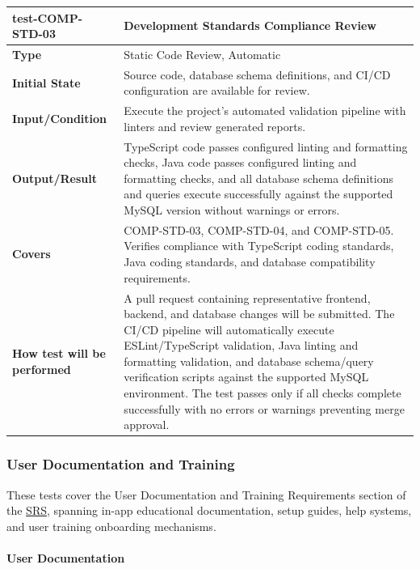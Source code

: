\documentclass[12pt, titlepage]{article}
\begin{document}
\noindent\begin{tabularx}{\textwidth}{>{\raggedright\arraybackslash}p{3.5cm}X}
  \toprule
  \textbf{test-COMP-STD-03} & \textbf{Development Standards Compliance Review}\\
  \midrule
  \textbf{Type} & Static Code Review, Automatic\\
  \textbf{Initial State} & Source code, database schema definitions, and CI/CD configuration are available for review.\\
  \textbf{Input/Condition} & Execute the project's automated validation pipeline with linters and review generated reports.\\
  \textbf{Output/Result} & TypeScript code passes configured linting and formatting checks, Java code passes configured linting and formatting checks, and all database schema definitions and queries execute successfully against the supported MySQL version without warnings or errors.\\
  \textbf{Covers} & COMP-STD-03, COMP-STD-04, and COMP-STD-05. Verifies compliance with TypeScript coding standards, Java coding standards, and database compatibility requirements.\\
  \textbf{How test will be performed} & A pull request containing representative frontend, backend, and database changes will be submitted. The CI/CD pipeline will automatically execute ESLint/TypeScript validation, Java linting and formatting validation, and database schema/query verification scripts against the supported MySQL environment. The test passes only if all checks complete successfully with no errors or warnings preventing merge approval.\\
  \bottomrule
\end{tabularx}

\subsubsection{User Documentation and Training}

These tests cover the User Documentation and Training Requirements section of the \href{https://github.com/arjunkarthik123/fitness-finance-application/blob/main/pdfs/SRS-Volere/SRS.pdf}{SRS}, spanning in-app educational documentation, setup guides, help systems, and user training onboarding mechanisms.

\paragraph{User Documentation}
\end{document}

